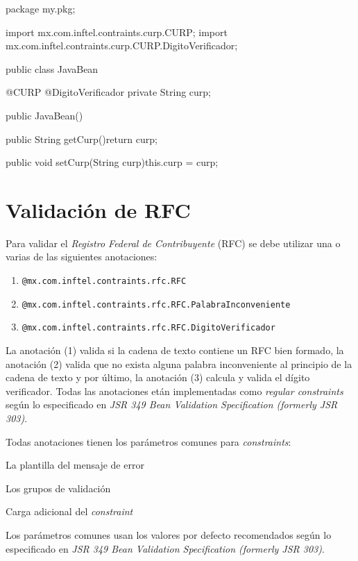 \documentclass[12pt,letterpaper]{article}
\begin{document}
\begin{listing}{1}
package my.pkg;

import mx.com.inftel.contraints.curp.CURP;
import mx.com.inftel.contraints.curp.CURP.DigitoVerificador;

public class JavaBean{

    @CURP
    @DigitoVerificador
    private String curp;

    public JavaBean(){}

    public String getCurp(){return curp;}

    public void setCurp(String curp){this.curp = curp;}
}
\end{listing}

\section{Validación de RFC}

Para validar el \emph{Registro Federal de Contribuyente} (RFC) se debe utilizar una o varias de
las siguientes anotaciones:

\begin{enumerate}[noitemsep]
\item \texttt{@mx.com.inftel.contraints.rfc.RFC}
\item \texttt{@mx.com.inftel.contraints.rfc.RFC.PalabraInconveniente}
\item \texttt{@mx.com.inftel.contraints.rfc.RFC.DigitoVerificador}
\end{enumerate}

La anotación (1) valida si la cadena de texto contiene un RFC bien formado, la anotación (2) valida que no exista
alguna palabra inconveniente al principio de la cadena de texto y por último, la anotación (3) calcula y valida
el dígito verificador. Todas las anotaciones etán implementadas como \emph{regular constraints} según lo especificado
en \emph{JSR 349 Bean Validation Specification (formerly JSR 303)}.

Todas anotaciones tienen los parámetros comunes para \emph{constraints}:

\begin{description}[noitemsep]
\item[message] La plantilla del mensaje de error
\item[groups] Los grupos de validación
\item[payload] Carga adicional del \emph{constraint}
\end{description}

Los parámetros comunes usan los valores por defecto recomendados según lo especificado en \emph{JSR 349 Bean
Validation Specification (formerly JSR 303)}.
\end{document}
